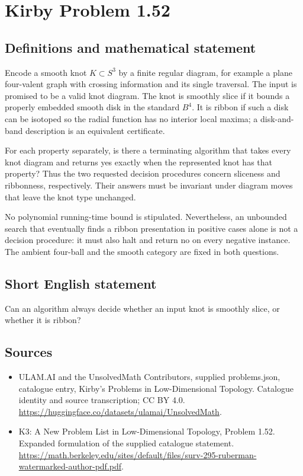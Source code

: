 \documentclass[11pt,a4paper]{article}
\begin{document}
\section*{Kirby Problem 1.52}\label{statement}

\subsection{Definitions and mathematical statement}
Encode a smooth knot $K\subset S^3$ by a finite regular diagram, for example a
plane four-valent graph with crossing information and its single traversal.
The input is promised to be a valid knot diagram. The knot is smoothly slice
if it bounds a properly embedded smooth disk in the standard $B^4$.
It is ribbon if such a disk can be isotoped so the radial function has no
interior local maxima; a disk-and-band description is an equivalent certificate.

For each property separately, is there a terminating algorithm that takes every
knot diagram and returns yes exactly when the represented knot has that
property? Thus the two requested decision procedures concern sliceness and
ribbonness, respectively. Their answers must be invariant under diagram moves
that leave the knot type unchanged.

No polynomial running-time bound is stipulated. Nevertheless, an unbounded
search that eventually finds a ribbon presentation in positive cases alone is
not a decision procedure: it must also halt and return no on every negative
instance. The ambient four-ball and the smooth category are fixed in both
questions.
\subsection{Short English statement}
Can an algorithm always decide whether an input knot is smoothly slice, or whether it is ribbon?
\subsection{Sources}
\begin{itemize}
\item[S1] ULAM.AI and the UnsolvedMath Contributors, supplied problems.json, catalogue entry, Kirby's Problems in Low-Dimensional Topology. Catalogue identity and source transcription; CC BY 4.0.
\url{https://huggingface.co/datasets/ulamai/UnsolvedMath}.
\item[S2] K3: A New Problem List in Low-Dimensional Topology, Problem 1.52. Expanded formulation of the supplied catalogue statement.
\url{https://math.berkeley.edu/sites/default/files/surv-295-ruberman-watermarked-author-pdf.pdf}.
\end{itemize}
\end{document}
